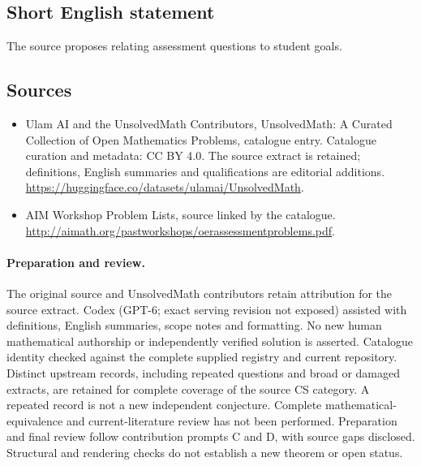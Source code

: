 \documentclass[11pt]{article}
\begin{document}
\subsection{Short English statement}
The source proposes relating assessment questions to student goals.
\subsection{Sources}
\begin{itemize}
\item[\hypertarget{source:statement:1}{S1}] Ulam AI and the UnsolvedMath Contributors, UnsolvedMath: A Curated Collection of Open Mathematics Problems, catalogue entry. Catalogue curation and metadata: CC BY 4.0. The source extract is retained; definitions, English summaries and qualifications are editorial additions.
\url{https://huggingface.co/datasets/ulamai/UnsolvedMath}.
\item[\hypertarget{source:statement:2}{S2}] AIM Workshop Problem Lists, source linked by the catalogue.
\url{http://aimath.org/pastworkshops/oerassessmentproblems.pdf}.
\end{itemize}
\paragraph{Preparation and review.}
The original source and UnsolvedMath contributors retain attribution for the source extract. Codex (GPT-6; exact serving revision not exposed) assisted with definitions, English summaries, scope notes and formatting. No new human mathematical authorship or independently verified solution is asserted. Catalogue identity checked against the complete supplied registry and current repository. Distinct upstream records, including repeated questions and broad or damaged extracts, are retained for complete coverage of the source CS category. A repeated record is not a new independent conjecture. Complete mathematical-equivalence and current-literature review has not been performed. Preparation and final review follow contribution prompts C and D, with source gaps disclosed. Structural and rendering checks do not establish a new theorem or open status.
\label{end:statement}
\end{document}
